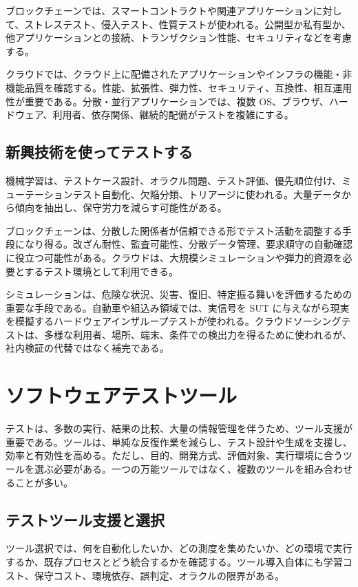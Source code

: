 \documentclass[uplatex,dvipdfmx,a4paper,11pt,nomag]{jsarticle}
\begin{document}
ブロックチェーンでは、スマートコントラクトや関連アプリケーションに対して、ストレステスト、侵入テスト、性質テストが使われる。公開型か私有型か、他アプリケーションとの接続、トランザクション性能、セキュリティなどを考慮する。

クラウドでは、クラウド上に配備されたアプリケーションやインフラの機能・非機能品質を確認する。性能、拡張性、弾力性、セキュリティ、互換性、相互運用性が重要である。分散・並行アプリケーションでは、複数 OS、ブラウザ、ハードウェア、利用者、依存関係、継続的配備がテストを複雑にする。

\subsection{新興技術を使ってテストする}
機械学習は、テストケース設計、オラクル問題、テスト評価、優先順位付け、ミューテーションテスト自動化、欠陥分類、トリアージに使われる。大量データから傾向を抽出し、保守労力を減らす可能性がある。

ブロックチェーンは、分散した関係者が信頼できる形でテスト活動を調整する手段になり得る。改ざん耐性、監査可能性、分散データ管理、要求順守の自動確認に役立つ可能性がある。クラウドは、大規模シミュレーションや弾力的資源を必要とするテスト環境として利用できる。

シミュレーションは、危険な状況、災害、復旧、特定振る舞いを評価するための重要な手段である。自動車や組込み領域では、実信号を SUT に与えながら現実を模擬するハードウェアインザループテストが使われる。クラウドソーシングテストは、多様な利用者、場所、端末、条件での検出力を得るために使われるが、社内検証の代替ではなく補完である。

\section{ソフトウェアテストツール}
テストは、多数の実行、結果の比較、大量の情報管理を伴うため、ツール支援が重要である。ツールは、単純な反復作業を減らし、テスト設計や生成を支援し、効率と有効性を高める。ただし、目的、開発方式、評価対象、実行環境に合うツールを選ぶ必要がある。一つの万能ツールではなく、複数のツールを組み合わせることが多い。

\subsection{テストツール支援と選択}
ツール選択では、何を自動化したいか、どの測度を集めたいか、どの環境で実行するか、既存プロセスとどう統合するかを確認する。ツール導入自体にも学習コスト、保守コスト、環境依存、誤判定、オラクルの限界がある。
\end{document}
